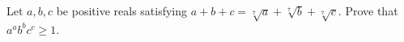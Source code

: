 Let $a,b,c$ be positive reals satisfying $a+b+c = \sqrt[7]{a} + \sqrt[7]{b} + \sqrt[7]{c}$.  Prove that $a^a b^b c^c \ge 1$.
